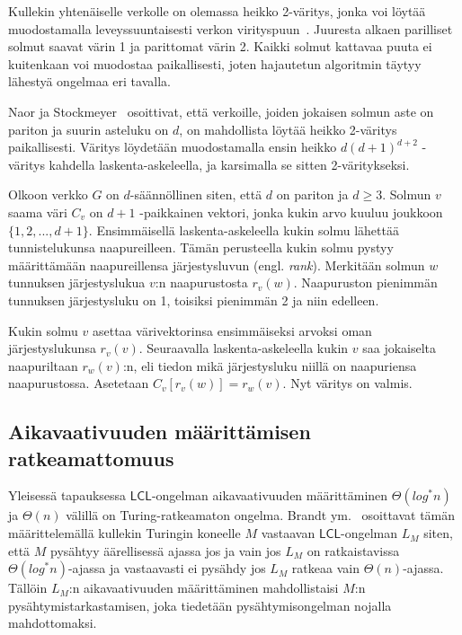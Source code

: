 \documentclass[12pt,finnish]{tktltiki2}
\theoremstyle{definition}
\theoremstyle{remark}
\newcommand*{\lcl}{\ensuremath{\mathsf{LCL}}}
\begin{document}
Kullekin yhtenäiselle verkolle on olemassa heikko 2-väritys, jonka voi löytää muodostamalla leveyssuuntaisesti verkon virityspuun~\cite{naor95}. Juuresta alkaen parilliset solmut saavat värin 1 ja parittomat värin 2. Kaikki solmut kattavaa puuta ei kuitenkaan voi muodostaa paikallisesti, joten hajautetun algoritmin täytyy lähestyä ongelmaa eri tavalla.

Naor ja Stockmeyer~\cite{naor95} osoittivat, että verkoille, joiden jokaisen solmun aste on pariton ja suurin asteluku on $d$, on mahdollista löytää heikko 2-väritys paikallisesti. Väritys löydetään muodostamalla ensin heikko $d(d + 1)^{d+2}$ -väritys kahdella laskenta-askeleella, ja karsimalla se sitten 2-väritykseksi.

Olkoon verkko $G$ on $d$-säännöllinen siten, että $d$ on pariton ja $d \geq 3$. Solmun $v$ saama väri $C_v$ on $d+1$ -paikkainen vektori, jonka kukin arvo kuuluu joukkoon $\{1, 2, ..., d+1\}$. Ensimmäisellä laskenta-askeleella kukin solmu lähettää tunnistelukunsa naapureilleen. Tämän perusteella kukin solmu pystyy määrittämään naapureillensa järjestysluvun (engl. \textit{rank}). Merkitään solmun $w$ tunnuksen järjestyslukua $v$:n naapurustosta $r_v(w)$. Naapuruston pienimmän tunnuksen järjestysluku on 1, toisiksi pienimmän 2 ja niin edelleen.

Kukin solmu $v$ asettaa värivektorinsa ensimmäiseksi arvoksi oman järjestyslukunsa $r_v(v)$. Seuraavalla laskenta-askeleella kukin $v$ saa jokaiselta naapuriltaan $r_w(v)$:n, eli tiedon mikä järjestysluku niillä on naapuriensa naapurustossa. Asetetaan $C_v[r_v(w)] = r_w(v)$. Nyt väritys on valmis.
\fi



\subsection{Aikavaativuuden määrittämisen ratkeamattomuus}
Yleisessä tapauksessa \lcl -ongelman aikavaativuuden määrittäminen $\Theta(log^* n)$ ja $\Theta(n)$ välillä on Turing-ratkeamaton ongelma. Brandt ym.~\cite{brandt} osoittavat tämän määrittelemällä kullekin Turingin koneelle $M$ vastaavan \lcl -ongelman $L_M$ siten, että $M$ pysähtyy äärellisessä ajassa jos ja vain jos $L_M$ on ratkaistavissa $\Theta(log^* n)$-ajassa ja vastaavasti ei pysähdy jos $L_M$ ratkeaa vain $\Theta(n)$-ajassa. Tällöin $L_M$:n aikavaativuuden määrittäminen mahdollistaisi $M$:n pysähtymistarkastamisen, joka tiedetään pysähtymisongelman nojalla mahdottomaksi.
\end{document}
